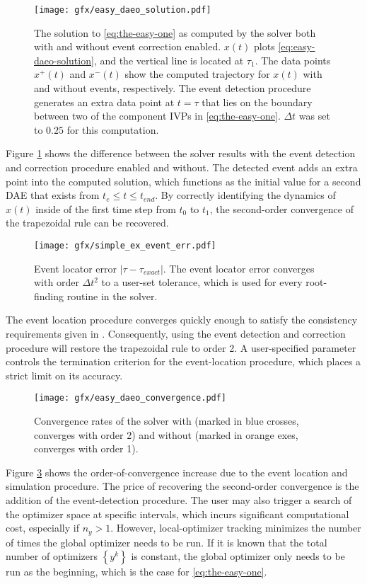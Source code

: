 \documentclass[twoside,leqno, twocolumn]{article}
\newcommand{\abs}[1]{\ensuremath{\left|#1\right|}}
\begin{document}
\begin{figure}[tb]
	\centering
	\texttt{[image: gfx/easy\_daeo\_solution.pdf]}
	\caption{The solution to \eqref{eq:the-easy-one} as computed by the solver both with and without event correction enabled. $x(t)$ plots \eqref{eq:easy-daeo-solution}, and the vertical line is located at $\tau_1$. The data points $x^+(t)$ and $x^-(t)$ show the computed trajectory for $x(t)$ with and without events, respectively.  The event detection procedure generates an extra data point at $t={\tau}$ that lies on the boundary between two of the component IVPs in \eqref{eq:the-easy-one}. $\Delta t$ was set to $0.25$ for this computation.}
	\label{fig:easy-example-solution}
\end{figure}
Figure \ref{fig:easy-example-solution} shows the difference between the solver results with the event detection and correction procedure enabled and without. The detected event adds an extra point into the computed solution, which functions as the initial value for a second DAE that exists from $t_{e} \leq t \leq t_{end}$. By correctly identifying the dynamics of $x(t)$ inside of the first time step from $t_0$ to $t_1$, the second-order convergence of the trapezoidal rule can be recovered.

\begin{figure}[h]
	\centering
	\texttt{[image: gfx/simple\_ex\_event\_err.pdf]}
	\caption{Event locator error $\abs{\tau - \tau_{exact}}$. The event locator error converges with order $\Delta t^2$ to a user-set tolerance, which is used for every root-finding routine in the solver.}
	\label{fig:easy-event-location}
\end{figure}
The event location procedure converges quickly enough to satisfy the consistency requirements given in \cite{mannshardtOnestepMethodsAny1978}. Consequently, using the event detection and correction procedure will restore the trapezoidal rule to order 2. A user-specified parameter controls the termination criterion for the event-location procedure, which places a strict limit on its accuracy.

\begin{figure}[h]
	\centering
	\texttt{[image: gfx/easy\_daeo\_convergence.pdf]}
	\caption{Convergence rates of the solver with (marked in blue crosses, converges with order 2) and without (marked in orange exes, converges with order 1).}
	\label{fig:easy-error-improvement}
\end{figure}
Figure \ref{fig:easy-error-improvement} shows the order-of-convergence increase due to the event location and simulation procedure. The price of recovering the second-order convergence is the addition of the event-detection procedure. The user may also trigger a search of the optimizer space at specific intervals, which incurs significant computational cost, especially if $n_y > 1$. However, local-optimizer tracking minimizes the number of times the global optimizer needs to be run. If it is known that the total number of optimizers $\left\{y^k\right\}$ is constant, the global optimizer only needs to be run as the beginning, which is the case for \eqref{eq:the-easy-one}.
\end{document}
